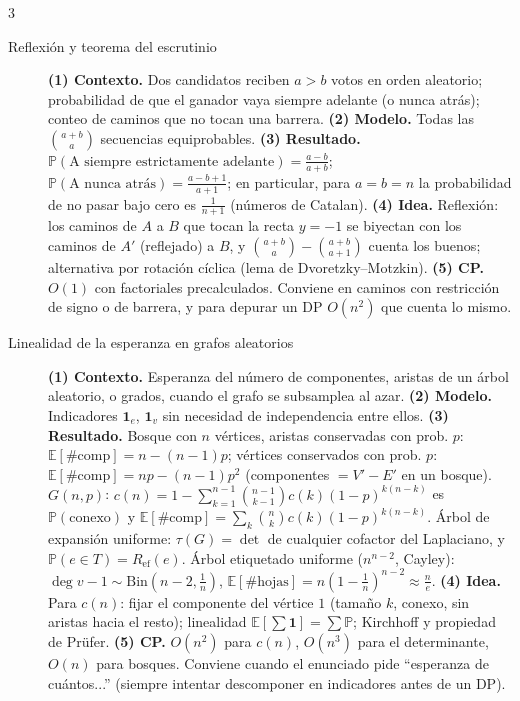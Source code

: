 \documentclass[8pt, spanish, mexico, letterpaper]{extarticle}
\newcommand{\E}{\mathbb{E}}
\newcommand{\Prob}{\mathbb{P}}
\newcommand{\<}{<}
\begin{document}
\begin{multicols*}{3}
\begin{description}
\item[Reflexi\'on y teorema del escrutinio] \textbf{(1) Contexto.} Dos candidatos reciben $a>b$ votos en orden aleatorio; probabilidad de que el ganador vaya siempre adelante (o nunca atr\'as); conteo de caminos que no tocan una barrera. \textbf{(2) Modelo.} Todas las $\binom{a+b}{a}$ secuencias equiprobables. \textbf{(3) Resultado.} $\Prob(\text{A siempre estrictamente adelante})=\frac{a-b}{a+b}$; $\Prob(\text{A nunca atr\'as})=\frac{a-b+1}{a+1}$; en particular, para $a{=}b{=}n$ la probabilidad de no pasar bajo cero es $\frac1{n+1}$ (n\'umeros de Catalan). \textbf{(4) Idea.} Reflexi\'on: los caminos de $A$ a $B$ que tocan la recta $y=-1$ se biyectan con los caminos de $A'$ (reflejado) a $B$, y $\binom{a+b}{a}-\binom{a+b}{a+1}$ cuenta los buenos; alternativa por rotaci\'on c\'iclica (lema de Dvoretzky--Motzkin). \textbf{(5) CP.} $O(1)$ con factoriales precalculados. Conviene en caminos con restricci\'on de signo o de barrera, y para depurar un DP $O(n^2)$ que cuenta lo mismo.

\item[Linealidad de la esperanza en grafos aleatorios] \textbf{(1) Contexto.} Esperanza del n\'umero de componentes, aristas de un \'arbol aleatorio, o grados, cuando el grafo se subsamplea al azar. \textbf{(2) Modelo.} Indicadores $\mathbf 1_e$, $\mathbf 1_v$ sin necesidad de independencia entre ellos. \textbf{(3) Resultado.} Bosque con $n$ v\'ertices, aristas conservadas con prob. $p$: $\E[\#\text{comp}]=n-(n - 1)p$; v\'ertices conservados con prob. $p$: $\E[\#\text{comp}]=np-(n - 1)p^2$ (componentes $=V'-E'$ en un bosque). $G(n,p)$: $c(n)=1-\sum_{k=1}^{n-1}\binom{n-1}{k-1}c(k)(1 - p)^{k(n-k)}$ es $\Prob(\text{conexo})$ y $\E[\#\text{comp}]=\sum_k\binom nk c(k)(1 - p)^{k(n-k)}$. \'Arbol de expansi\'on uniforme: $\tau(G)=\det$ de cualquier cofactor del Laplaciano, y $\Prob(e\in T)=R_{\mathrm{ef}}(e)$. \'Arbol etiquetado uniforme ($n^{n-2}$, Cayley): $\deg v-1\sim\mathrm{Bin}(n - 2,\tfrac1n)$, $\E[\#\text{hojas}]=n(1 - \tfrac1n)^{n-2}\approx\tfrac ne$. \textbf{(4) Idea.} Para $c(n)$: fijar el componente del v\'ertice $1$ (tama\~no $k$, conexo, sin aristas hacia el resto); linealidad $\E[\sum\mathbf 1]=\sum\Prob$; Kirchhoff y propiedad de Prüfer. \textbf{(5) CP.} $O(n^2)$ para $c(n)$, $O(n^3)$ para el determinante, $O(n)$ para bosques. Conviene cuando el enunciado pide ``esperanza de cu\'antos...'' (siempre intentar descomponer en indicadores antes de un DP).


\end{description}
\end{multicols*}
\end{document}
